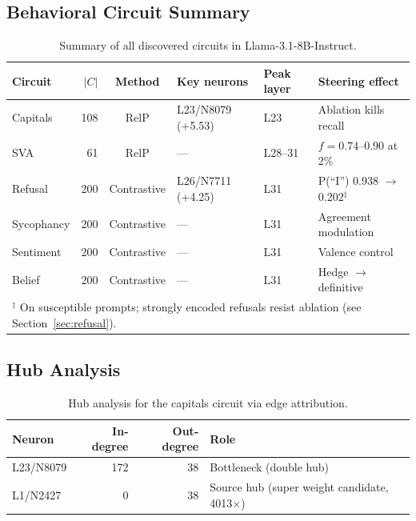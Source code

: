 \documentclass[11pt]{article}
\begin{document}
\subsection{Behavioral Circuit Summary}

\begin{table}[h]
\centering
\caption{Summary of all discovered circuits in Llama-3.1-8B-Instruct.}
\label{tab:all_circuits}
\small
\begin{tabular}{lrclll}
\toprule
\textbf{Circuit} & \textbf{$|C|$} & \textbf{Method} & \textbf{Key neurons} & \textbf{Peak layer} & \textbf{Steering effect} \\
\midrule
Capitals  & 108 & RelP        & L23/N8079 (+5.53) & L23 & Ablation kills recall \\
SVA       &  61 & RelP        & --- & L28--31 & $f{=}0.74$--$0.90$ at 2\% \\
Refusal   & 200 & Contrastive & L26/N7711 (+4.25) & L31 & P(``I'') 0.938 $\to$ 0.202$^\ddagger$ \\
Sycophancy& 200 & Contrastive & --- & L31 & Agreement modulation \\
Sentiment & 200 & Contrastive & --- & L31 & Valence control \\
Belief    & 200 & Contrastive & --- & L31 & Hedge $\to$ definitive \\
\bottomrule
\multicolumn{6}{l}{\footnotesize $^\ddagger$ On susceptible prompts; strongly encoded refusals resist ablation (see Section~\ref{sec:refusal}).}
\end{tabular}
\end{table}


\subsection{Hub Analysis}

\begin{table}[h]
\centering
\caption{Hub analysis for the capitals circuit via edge attribution.}
\label{tab:hubs}
\small
\begin{tabular}{lrrl}
\toprule
\textbf{Neuron} & \textbf{In-degree} & \textbf{Out-degree} & \textbf{Role} \\
\midrule
L23/N8079 & 172 & 38 & Bottleneck (double hub) \\
L1/N2427  & 0   & 38 & Source hub (super weight candidate, 4013$\times$) \\
\bottomrule
\end{tabular}
\end{table}
\end{document}
